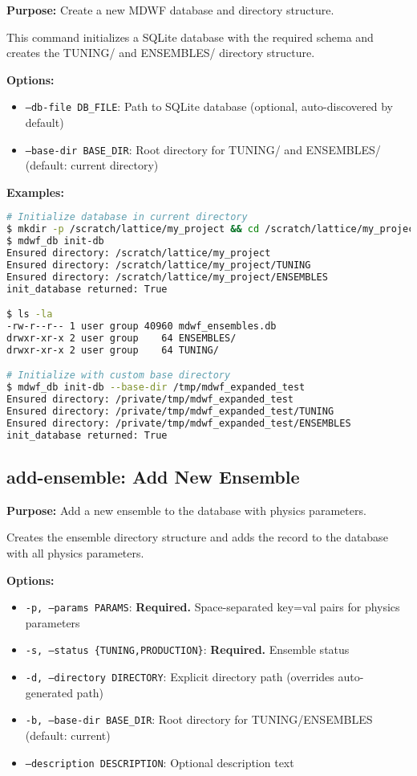 \documentclass{article}
\begin{document}
\textbf{Purpose:} Create a new MDWF database and directory structure.

This command initializes a SQLite database with the required schema and creates the TUNING/ and ENSEMBLES/ directory structure.

\textbf{Options:}
\begin{itemize}
\item \texttt{--db-file DB\_FILE}: Path to SQLite database (optional, auto-discovered by default)
\item \texttt{--base-dir BASE\_DIR}: Root directory for TUNING/ and ENSEMBLES/ (default: current directory)
\end{itemize}

\textbf{Examples:}

\begin{lstlisting}[language=bash]
# Initialize database in current directory
$ mkdir -p /scratch/lattice/my_project && cd /scratch/lattice/my_project
$ mdwf_db init-db
Ensured directory: /scratch/lattice/my_project
Ensured directory: /scratch/lattice/my_project/TUNING  
Ensured directory: /scratch/lattice/my_project/ENSEMBLES
init_database returned: True

$ ls -la
-rw-r--r-- 1 user group 40960 mdwf_ensembles.db
drwxr-xr-x 2 user group    64 ENSEMBLES/
drwxr-xr-x 2 user group    64 TUNING/

# Initialize with custom base directory
$ mdwf_db init-db --base-dir /tmp/mdwf_expanded_test
Ensured directory: /private/tmp/mdwf_expanded_test
Ensured directory: /private/tmp/mdwf_expanded_test/TUNING
Ensured directory: /private/tmp/mdwf_expanded_test/ENSEMBLES
init_database returned: True
\end{lstlisting}

\subsection{add-ensemble: Add New Ensemble}

\textbf{Purpose:} Add a new ensemble to the database with physics parameters.

Creates the ensemble directory structure and adds the record to the database with all physics parameters.

\textbf{Options:}
\begin{itemize}
\item \texttt{-p, --params PARAMS}: \textbf{Required.} Space-separated key=val pairs for physics parameters
\item \texttt{-s, --status \{TUNING,PRODUCTION\}}: \textbf{Required.} Ensemble status
\item \texttt{-d, --directory DIRECTORY}: Explicit directory path (overrides auto-generated path)
\item \texttt{-b, --base-dir BASE\_DIR}: Root directory for TUNING/ENSEMBLES (default: current)
\item \texttt{--description DESCRIPTION}: Optional description text
\end{itemize}
\end{document}
